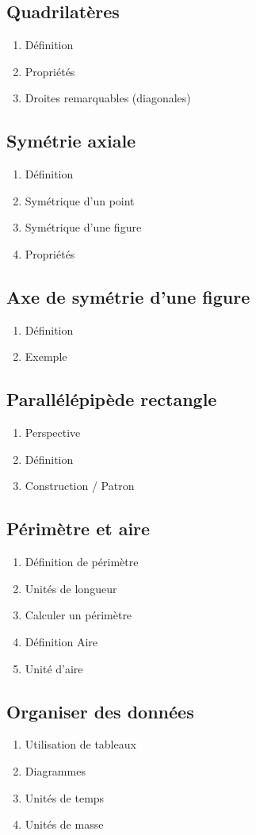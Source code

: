\subsection{Quadrilatères}\label{ch_6_quad}
\begin{enumerate}
	\item Définition
	\item Propriétés
	\item Droites remarquables (diagonales)
\end{enumerate}

\subsection{Symétrie axiale}\label{ch_6_sym}

\begin{enumerate}
	\item Définition
	\item Symétrique d'un point
	\item Symétrique d'une figure
	\item Propriétés
\end{enumerate}

\subsection{Axe de symétrie d'une figure}\label{ch_6_axe}

\begin{enumerate}
	\item Définition
	\item Exemple
\end{enumerate}

\subsection{Parallélépipède rectangle}\label{ch_6_pave}

\begin{enumerate}
	\item Perspective
	\item Définition
	\item Construction / Patron
\end{enumerate}

\subsection{Périmètre et aire}\label{ch_6_peri}

\begin{enumerate}
	\item Définition de périmètre
	\item Unités de longueur
	\item Calculer un périmètre
	\item Définition Aire
	\item Unité d'aire
\end{enumerate}

\subsection{Organiser des données}\label{ch_6_data}

\begin{enumerate}
	\item Utilisation de tableaux
	\item Diagrammes
	\item Unités de temps
	\item Unités de masse	
\end{enumerate}